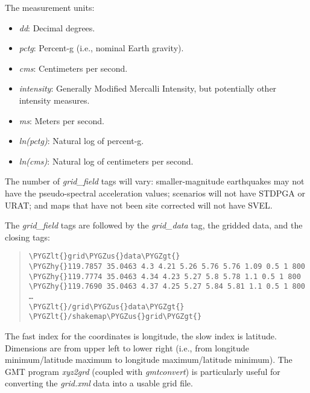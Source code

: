 \documentclass[letterpaper,10pt,english]{sphinxmanual}
\def\PYGZus{\char`\_}
\def\PYGZlt{\char`\<}
\def\PYGZgt{\char`\>}
\def\PYGZhy{\char`\-}
\begin{document}
The measurement units:
\begin{itemize}
\item {} 
\emph{dd}:         Decimal degrees.

\item {} 
\emph{pctg}:       Percent-g (i.e., nominal Earth gravity).

\item {} 
\emph{cms}:        Centimeters per second.

\item {} 
\emph{intensity}:  Generally Modified Mercalli Intensity, but potentially other intensity measures.

\item {} 
\emph{ms}:         Meters per second.

\item {} 
\emph{ln(pctg)}:   Natural log of percent-g.

\item {} 
\emph{ln(cms)}:    Natural log of centimeters per second.

\end{itemize}

The number of \emph{grid\_field} tags will vary: smaller-magnitude earthquakes may not
have the pseudo-spectral acceleration values; scenarios will not have STDPGA or
URAT; and maps that have not been site corrected will not have SVEL.

The \emph{grid\_field} tags are followed by the \emph{grid\_data} tag, the gridded data, and the closing tags:
\begin{quote}

\begin{Verbatim}[commandchars=\\\{\}]
\PYGZlt{}grid\PYGZus{}data\PYGZgt{}
\PYGZhy{}119.7857 35.0463 4.3 4.21 5.26 5.76 5.76 1.09 0.5 1 800
\PYGZhy{}119.7774 35.0463 4.34 4.23 5.27 5.8 5.78 1.1 0.5 1 800
\PYGZhy{}119.7690 35.0463 4.37 4.25 5.27 5.84 5.81 1.1 0.5 1 800
…
\PYGZlt{}/grid\PYGZus{}data\PYGZgt{}
\PYGZlt{}/shakemap\PYGZus{}grid\PYGZgt{}
\end{Verbatim}
\end{quote}

The fast index for the coordinates is longitude, the slow index is latitude.
Dimensions are from upper left to lower right (i.e., from longitude
minimum/latitude maximum to longitude maximum/latitude minimum). The GMT program
\emph{xyz2grd} (coupled with \emph{gmtconvert}) is particularly useful for converting the
\emph{grid.xml} data into a usable grid file.
\end{document}

